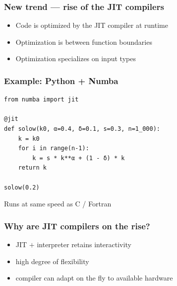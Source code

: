 \documentclass[
    xcolor={svgnames,dvipsnames},
    hyperref={colorlinks, citecolor=DeepPink4, linkcolor=DarkRed, urlcolor=DarkBlue}
    ]{beamer}  %
\newcommand{\1}{\mathbbm 1}
\begin{document}
\begin{frame}[fragile]
    \frametitle{New trend --- rise of the JIT compilers}
    
    \begin{itemize}
        \item Code is optimized by the JIT compiler at runtime
        \vspace{0.5em}
        \item Optimization is between function boundaries
        \vspace{0.5em}
        \item Optimization specializes on input types
    \end{itemize}

\end{frame}

\begin{frame}[fragile]
    \frametitle{Example: Python + Numba}
    
    \begin{verbatim}
from numba import jit

@jit
def solow(k0, α=0.4, δ=0.1, s=0.3, n=1_000):
    k = k0
    for i in range(n-1):
        k = s * k**α + (1 - δ) * k
    return k

solow(0.2)
    \end{verbatim}


    Runs at same speed as C / Fortran

\end{frame}


\begin{frame}
    \frametitle{Why are JIT compilers on the rise?}

    \begin{itemize}
        \item JIT $+$ interpreter retains interactivity
        \vspace{0.5em}
        \item high degree of flexibility
        \vspace{0.5em}
        \item compiler can adapt on the fly to available hardware
    \end{itemize}

\end{frame}
\end{document}
